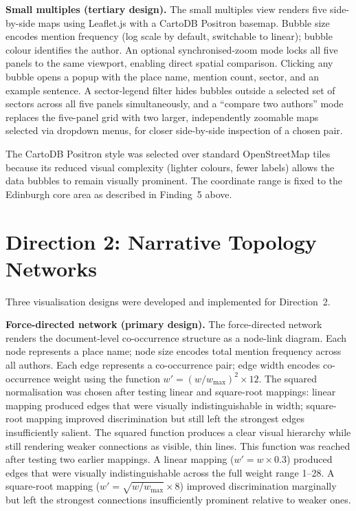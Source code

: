\documentclass[logo,msc]{infthesis}
\begin{document}
\textbf{Small multiples (tertiary design).} The small multiples view renders five side-by-side maps using Leaflet.js with a CartoDB Positron basemap. Bubble size encodes mention frequency (log scale by default, switchable to linear); bubble colour identifies the author. An optional synchronised-zoom mode locks all five panels to the same viewport, enabling direct spatial comparison. Clicking any bubble opens a popup with the place name, mention count, sector, and an example sentence. A sector-legend filter hides bubbles outside a selected set of sectors across all five panels simultaneously, and a ``compare two authors'' mode replaces the five-panel grid with two larger, independently zoomable maps selected via dropdown menus, for closer side-by-side inspection of a chosen pair.
 
The CartoDB Positron style was selected over standard OpenStreetMap tiles because its reduced visual complexity (lighter colours, fewer labels) allows the data bubbles to remain visually prominent. The coordinate range is fixed to the Edinburgh core area as described in Finding~5 above.
 
\section{Direction 2: Narrative Topology Networks}
 
Three visualisation designs were developed and implemented for Direction~2.
 
\textbf{Force-directed network (primary design).} The force-directed network renders the document-level co-occurrence structure as a node-link diagram. Each node represents a place name; node size encodes total mention frequency across all authors. Each edge represents a co-occurrence pair; edge width encodes co-occurrence weight using the function $w' = (w / w_{\max})^2 \times 12$. The squared normalisation was chosen after testing linear and square-root mappings: linear mapping produced edges that were visually indistinguishable in width; square-root mapping improved discrimination but still left the strongest edges insufficiently salient. The squared function produces a clear visual hierarchy while still rendering weaker connections as visible, thin lines. This function was reached after testing two earlier mappings. A linear mapping ($w' = w \times 0.3$) produced edges that were visually indistinguishable across the full weight range 1--28. A square-root mapping ($w' = \sqrt{w/w_{\max}} \times 8$) improved discrimination marginally but left the strongest connections insufficiently prominent relative to weaker ones.
 
\end{document}
